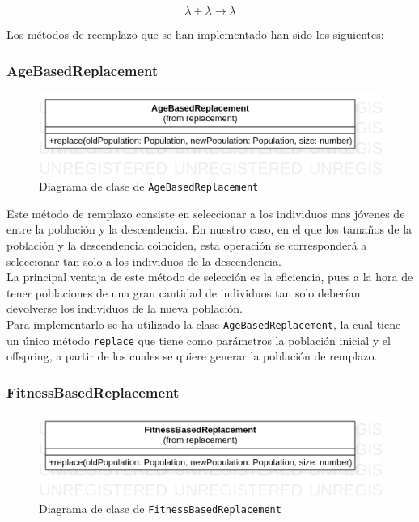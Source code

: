 \begin{equation}
    \lambda + \lambda \rightarrow \lambda
\end{equation}

Los métodos de reemplazo que se han implementado han sido los siguientes:

\subsubsection{AgeBasedReplacement}

\begin{figure}[ht]
    \centering
    \includegraphics[scale=0.4]{mem/images/cap-4/4.2.8(Reemplazo)/AgeBasedReplacement.png}
    \caption{Diagrama de clase de \texttt{AgeBasedReplacement}}
    \label{fig:my_label}
\end{figure}

Este método de remplazo consiste en seleccionar a los individuos mas jóvenes de entre la población y la descendencia. En nuestro caso, en el que los tamaños de la población y la descendencia coinciden, esta operación se corresponderá a seleccionar tan solo a los individuos de la descendencia. \\

La principal ventaja de este método de selección es la eficiencia, pues a la hora de tener poblaciones de una gran cantidad de individuos tan solo deberían devolverse los individuos de la nueva población. \\

Para implementarlo se ha utilizado la clase \texttt{AgeBasedReplacement}, la cual tiene un único método \texttt{replace} que tiene como parámetros la población inicial y el offspring, a partir de los cuales se quiere generar la población de remplazo.

\subsubsection{FitnessBasedReplacement}

\begin{figure}[ht]
    \centering
    \includegraphics[scale=0.4]{mem/images/cap-4/4.2.8(Reemplazo)/FitnessBasedReplacement.png}
    \caption{Diagrama de clase de \texttt{FitnessBasedReplacement}}
    \label{fig:my_label}
\end{figure}

